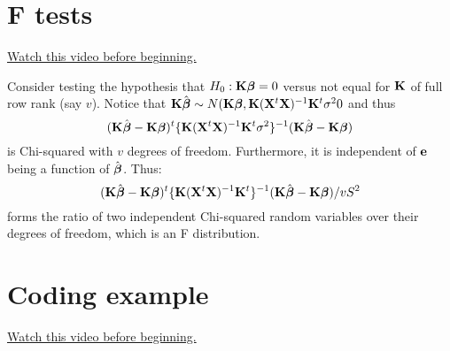\section{F tests}

\href{https://www.youtube.com/watch?v=H9rmN7lliXE&list=PLpl-gQkQivXhdgUCdaUQcdb31CRe8Mm2y&index=50}{Watch this video before beginning.}

\label{sec:ftest}
Consider testing the hypothesis that $H_0:\mathbf{K} \boldsymbol{\beta} = 0$ versus not equal for $\mathbf{K}$
of full row rank (say $v$). 
Notice that $\mathbf{K} \hat {\boldsymbol{\beta}} \sim N(\mathbf{K} \boldsymbol{\beta}, \mathbf{K} (\mathbf{X}^t \mathbf{X})^{-1} \mathbf{K}^t \sigma^20$ and thus
$$
(\mathbf{K} \hat {\boldsymbol{\beta}} - \mathbf{K} \boldsymbol{\beta})^t  \{\mathbf{K} (\mathbf{X}^t \mathbf{X})^{-1} \mathbf{K}^t \sigma^2 \}^{-1} (\mathbf{K} \hat {\boldsymbol{\beta}} - \mathbf{K} \boldsymbol{\beta})
$$
is Chi-squared with $v$ degrees of freedom. Furthermore, it is independent of
$\mathbf{e}$ being a function of $\hat {\boldsymbol{\beta}}$. Thus:
$$
(\mathbf{K} \hat {\boldsymbol{\beta}} - \mathbf{K} \boldsymbol{\beta})^t  \{\mathbf{K} (\mathbf{X}^t \mathbf{X})^{-1} \mathbf{K}^t\}^{-1} (\mathbf{K} \hat {\boldsymbol{\beta}} - \mathbf{K} \boldsymbol{\beta}) / v S^2
$$
forms the ratio of two independent Chi-squared random variables over their degrees of freedom, which is an F distribution. 



\section{Coding example}

\href{https://www.youtube.com/watch?v=bvoV41m5TQ8&list=PLpl-gQkQivXhdgUCdaUQcdb31CRe8Mm2y&index=51}{Watch this video before beginning.}

